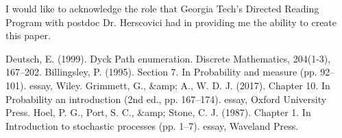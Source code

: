 \documentclass[12pt]{article}
\theoremstyle{definition}
\numberwithin{equation}{section}
\begin{document}

I would like to acknowledge the role that Georgia Tech's Directed Reading Program with postdoc Dr. Herscovici had in providing me the ability to create this paper.

\begin{thebibliography}{4}
     Deutsch, E. (1999). Dyck Path enumeration. Discrete Mathematics, 204(1-3), 167–202.
     Billingsley, P. (1995). Section 7. In Probability and measure (pp. 92–101). essay, Wiley. 
     Grimmett, G., \&amp; A., W. D. J. (2017). Chapter 10. In Probability an introduction (2nd ed., pp. 167–174). essay, Oxford University Press. 
     Hoel, P. G., Port, S. C., \&amp; Stone, C. J. (1987). Chapter 1. In Introduction to stochastic processes (pp. 1–7). essay, Waveland Press. 
\end{thebibliography}
\end{document}
